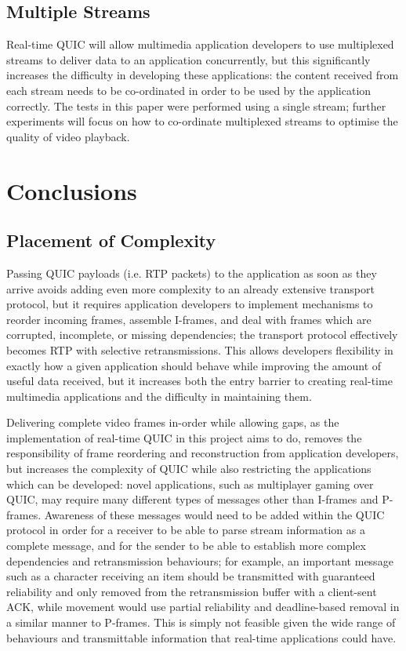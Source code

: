 \documentclass{mpaper}
\begin{document}
\subsection{Multiple Streams}
Real-time QUIC will allow multimedia application developers to use multiplexed streams to deliver data to an application concurrently, but this significantly increases the difficulty in developing these applications: the content received from each stream needs to be co-ordinated in order to be used by the application correctly. The tests in this paper were performed using a single stream; further experiments will focus on how to co-ordinate multiplexed streams to optimise the quality of video playback.

\section{Conclusions}

\subsection{Placement of Complexity}
Passing QUIC payloads (i.e. RTP packets) to the application as soon as they arrive avoids adding even more complexity to an already extensive transport protocol, but it requires application developers to implement mechanisms to reorder incoming frames, assemble I-frames, and deal with frames which are corrupted, incomplete, or missing dependencies; the transport protocol effectively becomes RTP with selective retransmissions. This allows developers flexibility in exactly how a given application should behave while improving the amount of useful data received, but it increases both the entry barrier to creating real-time multimedia applications and the difficulty in maintaining them.


Delivering complete video frames in-order while allowing gaps, as the implementation of real-time QUIC in this project aims to do, removes the responsibility of frame reordering and reconstruction from application developers, but increases the complexity of QUIC while also restricting the applications which can be developed: novel applications, such as multiplayer gaming over QUIC, may require many different types of messages other than I-frames and P-frames. Awareness of these messages would need to be added within the QUIC protocol in order for a receiver to be able to parse stream information as a complete message, and for the sender to be able to establish more complex dependencies and retransmission behaviours; for example, an important message such as a character receiving an item should be transmitted with guaranteed reliability and only removed from the retransmission buffer with a client-sent ACK, while movement would use partial reliability and deadline-based removal in a similar manner to P-frames. This is simply not feasible given the wide range of behaviours and transmittable information that real-time applications could have.
\end{document}
